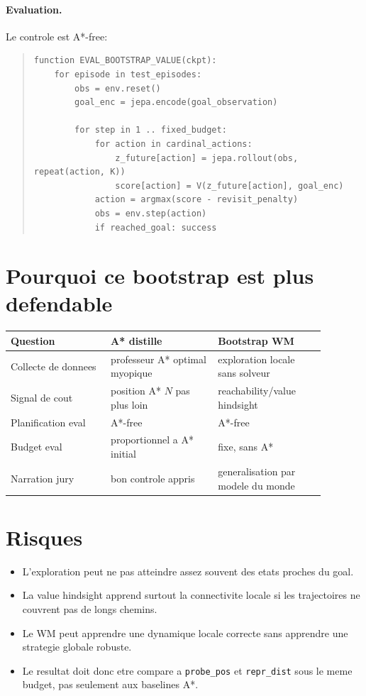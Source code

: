 \documentclass[11pt,a4paper]{article}
\newcommand{\code}[1]{\texttt{#1}}
\begin{document}
\paragraph{Evaluation.}
Le controle est A*-free:

\begin{quote}
\small
\begin{verbatim}
function EVAL_BOOTSTRAP_VALUE(ckpt):
    for episode in test_episodes:
        obs = env.reset()
        goal_enc = jepa.encode(goal_observation)

        for step in 1 .. fixed_budget:
            for action in cardinal_actions:
                z_future[action] = jepa.rollout(obs, repeat(action, K))
                score[action] = V(z_future[action], goal_enc)
            action = argmax(score - revisit_penalty)
            obs = env.step(action)
            if reached_goal: success
\end{verbatim}
\end{quote}

\section{Pourquoi ce bootstrap est plus defendable}

\begin{center}
\begin{tabular}{p{0.28\linewidth}p{0.30\linewidth}p{0.30\linewidth}}
\toprule
Question & A* distille & Bootstrap WM \\
\midrule
Collecte de donnees & professeur A* optimal myopique & exploration locale sans solveur \\
Signal de cout & position A* \(N\) pas plus loin & reachability/value hindsight \\
Planification eval & A*-free & A*-free \\
Budget eval & proportionnel a A* initial & fixe, sans A* \\
Narration jury & bon controle appris & generalisation par modele du monde \\
\bottomrule
\end{tabular}
\end{center}

\section{Risques}

\begin{itemize}
  \item L'exploration peut ne pas atteindre assez souvent des etats proches du goal.
  \item La value hindsight apprend surtout la connectivite locale si les trajectoires
        ne couvrent pas de longs chemins.
  \item Le WM peut apprendre une dynamique locale correcte sans apprendre une strategie
        globale robuste.
  \item Le resultat doit donc etre compare a \code{probe\_pos} et \code{repr\_dist}
        sous le meme budget, pas seulement aux baselines A*.
\end{itemize}
\end{document}
